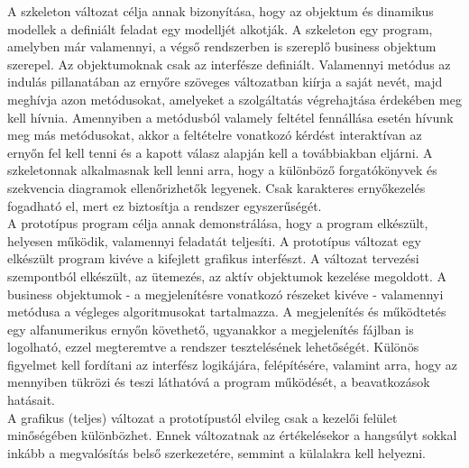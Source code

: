 A szkeleton változat célja annak bizonyítása, hogy az objektum és dinamikus modellek a definiált feladat egy modelljét alkotják. A szkeleton egy program, amelyben már valamennyi, a végső rendszerben is szereplő business objektum szerepel. Az objektumoknak csak az interfésze definiált. Valamennyi metódus az indulás pillanatában az ernyőre szöveges változatban kiírja a saját nevét, majd meghívja azon metódusokat, amelyeket a szolgáltatás végrehajtása érdekében meg kell hívnia. Amennyiben a metódusból valamely feltétel fennállása esetén hívunk meg más metódusokat, akkor a feltételre vonatkozó kérdést interaktívan az ernyőn fel kell tenni és a kapott válasz alapján kell a továbbiakban eljárni. A szkeletonnak alkalmasnak kell lenni arra, hogy a különböző forgatókönyvek és szekvencia diagramok ellenőrizhetők legyenek. Csak karakteres ernyőkezelés fogadható el, mert ez biztosítja a rendszer egyszerűségét.\\

A prototípus program célja annak demonstrálása, hogy a program elkészült, helyesen működik, valamennyi feladatát teljesíti. A prototípus változat egy elkészült program kivéve a kifejlett grafikus interfészt. A változat tervezési szempontból elkészült, az ütemezés, az aktív objektumok kezelése megoldott. A business objektumok - a megjelenítésre vonatkozó részeket kivéve - valamennyi metódusa a végleges algoritmusokat tartalmazza. A megjelenítés és működtetés egy alfanumerikus ernyőn követhető, ugyanakkor a megjelenítés fájlban is logolható, ezzel megteremtve a rendszer tesztelésének lehetőségét. Különös figyelmet kell fordítani az interfész logikájára, felépítésére, valamint arra, hogy az mennyiben tükrözi és teszi láthatóvá a program működését, a beavatkozások hatásait. \\

A grafikus (teljes) változat a prototípustól elvileg csak a kezelői felület minőségében különbözhet. Ennek
változatnak az értékelésekor a hangsúlyt sokkal inkább a megvalósítás belső szerkezetére, semmint a külalakra
kell helyezni.\\